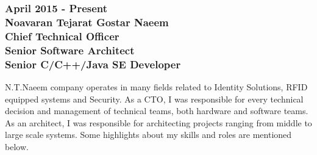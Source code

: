 \documentclass[10pt,a4paper]{article}
\begin{document}
\subsubsection{\textnormal {April 2015 - Present} \\ \textnormal {Noavaran Tejarat Gostar Naeem} \\ Chief Technical Officer \\ Senior Software Architect \\ Senior C/C++/Java SE Developer}
  \setlength{\leftskip}{0.5cm}
  \setlength{\rightskip}{1cm}
  N.T.Naeem company operates in many fields related to Identity Solutions, RFID equipped systems and Security. As a CTO, I was responsible for every technical decision and management of technical teams, both hardware and software teams. As an architect, I was responsible for architecting projects ranging from middle to large scale systems. Some highlights about my skills and roles are mentioned below.
\end{document}
